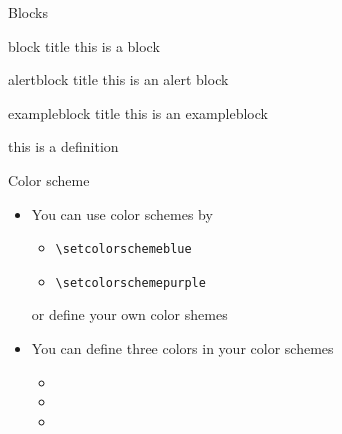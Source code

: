 \documentclass[13pt, dvipdfmx]{beamer}
\begin{document}
\begin{frame}[fragile]{Blocks}
    \begin{block}{block title}
        this is a block
    \end{block}

    \begin{alertblock}{alertblock title}
        this is an alert block
    \end{alertblock}
        
    \begin{exampleblock}{exampleblock title}
        this is an exampleblock
    \end{exampleblock}

    \begin{definition}
        this is a definition
    \end{definition}
\end{frame}


\begin{frame}[fragile]{Color scheme}
    \begin{itemize}
        
        \item You can use color schemes by
            \begin{itemize}
                \item \verb|\setcolorschemeblue|
                \item \verb|\setcolorschemepurple|
            \end{itemize}
            or define your own color shemes

        \item You can define three colors in your color schemes
        \begin{itemize}
            \item \color{textcolor}{textcolor}
            \item \color{maincolor}{maincolor}
            \item \color{alertcolor}{alertcolor}
        \end{itemize}
    \end{itemize}
\end{frame}
\end{document}
